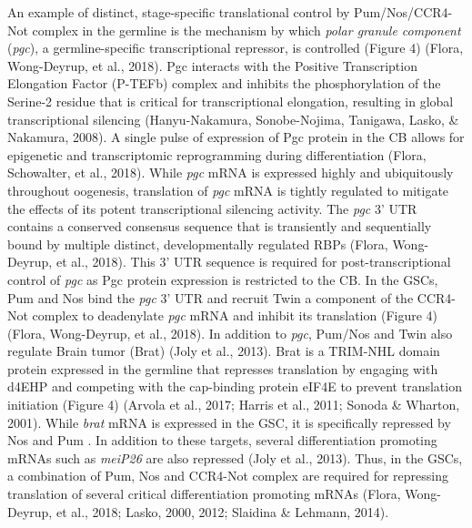\documentclass[12pt,oneside]{reedthesis}
\begin{document}
An example of distinct, stage-specific translational control by
Pum/Nos/CCR4-Not complex in the germline is the mechanism by which
\emph{polar granule component} (\emph{pgc}), a germline-specific transcriptional
repressor, is controlled (Figure 4) (Flora, Wong-Deyrup, et al., 2018). Pgc interacts with
the Positive Transcription Elongation Factor (P-TEFb) complex and
inhibits the phosphorylation of the Serine-2 residue that is critical
for transcriptional elongation, resulting in global transcriptional
silencing (Hanyu-Nakamura, Sonobe-Nojima, Tanigawa, Lasko, \& Nakamura, 2008). A single pulse of expression of Pgc
protein in the CB allows for epigenetic and transcriptomic reprogramming
during differentiation (Flora, Schowalter, et al., 2018). While \emph{pgc} mRNA is expressed
highly and ubiquitously throughout oogenesis, translation of \emph{pgc} mRNA
is tightly regulated to mitigate the effects of its potent
transcriptional silencing activity. The \emph{pgc} 3' UTR contains a
conserved consensus sequence that is transiently and sequentially bound
by multiple distinct, developmentally regulated RBPs (Flora, Wong-Deyrup, et al., 2018).
This 3' UTR sequence is required for post-transcriptional control of
\emph{pgc} as Pgc protein expression is restricted to the CB. In the GSCs,
Pum and Nos bind the \emph{pgc} 3' UTR and recruit Twin a component of the
CCR4-Not complex to deadenylate \emph{pgc} mRNA and inhibit its translation
(Figure 4) (Flora, Wong-Deyrup, et al., 2018). In addition to \emph{pgc}, Pum/Nos and Twin also
regulate Brain tumor (Brat) (Joly et al., 2013). Brat is a TRIM-NHL domain
protein expressed in the germline that represses translation by engaging
with d4EHP and competing with the cap-binding protein eIF4E to prevent
translation initiation (Figure 4) (Arvola et al., 2017; Harris et al., 2011; Sonoda \& Wharton, 2001). While \emph{brat} mRNA is expressed in the GSC, it is
specifically repressed by Nos and Pum . In addition to these targets,
several differentiation promoting mRNAs such as \emph{meiP26} are also
repressed (Joly et al., 2013). Thus, in the GSCs, a combination of Pum, Nos
and CCR4-Not complex are required for repressing translation of several
critical differentiation promoting mRNAs (Flora, Wong-Deyrup, et al., 2018; Lasko, 2000, 2012; Slaidina \& Lehmann, 2014).
\end{document}
